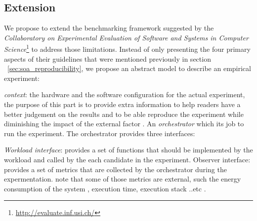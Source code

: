 
\subsection{Extension}\label{sec:bench_extension}
We propose to extend the benchmarking framework suggested by the \emph{Collaboratory on Experimental Evaluation of Software and Systems in Computer Science}\footnote{\url{http://evaluate.inf.usi.ch/}} to address those limitations.
Instead of only presenting the four primary aspects of their guidelines that were mentioned previously in section ~\ref{sec:soa_reproducibility}, we propose an abstract model to describe an empirical experiment:

\emph{context}: the hardware and the software configuration for the actual experiment, the purpose of this part is to provide extra information to help readers have a better judgement on the results and to be able reproduce the experiment while diminishing the impact of the external factor .
An \emph{orchestrator} which its job to run the experiment.
The orchestrator provides three interfaces:

\emph{Workload interface}: provides a set of functions that should be implemented by the workload  and called by the each candidate in the experiment.
Observer interface: provides a set of metrics that are collected by the orchestrator during the expermentation. note that some of those metrics are external, such the energy consumption of the system , execution time, execution stack ..etc .

